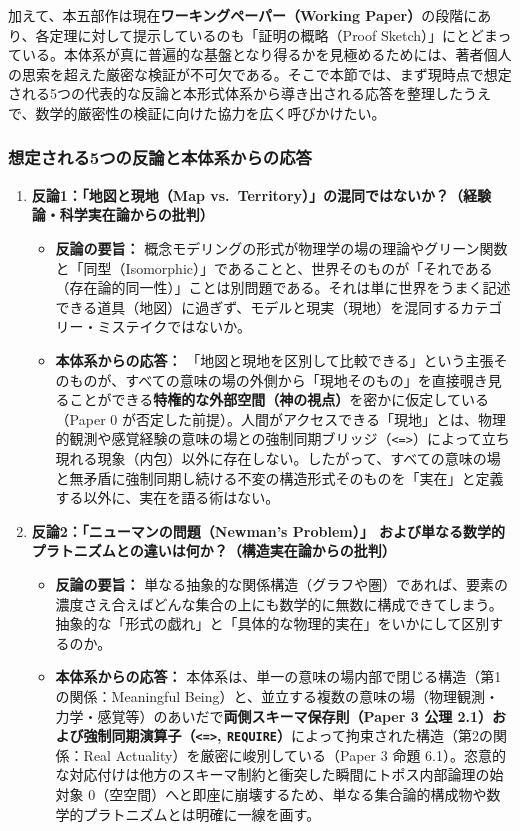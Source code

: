 \documentclass[11pt,a4paper]{ltjsarticle}
\theoremstyle{definition}
\theoremstyle{plain}
\begin{document}
加えて、本五部作は現在\textbf{ワーキングペーパー（Working Paper）}の段階にあり、各定理に対して提示しているのも「証明の概略（Proof Sketch）」にとどまっている。本体系が真に普遍的な基盤となり得るかを見極めるためには、著者個人の思索を超えた厳密な検証が不可欠である。そこで本節では、まず現時点で想定される5つの代表的な反論と本形式体系から導き出される応答を整理したうえで、数学的厳密性の検証に向けた協力を広く呼びかけたい。

\subsubsection*{想定される5つの反論と本体系からの応答}

\begin{enumerate}
    \item \textbf{反論1：「地図と現地（Map vs.\ Territory）」の混同ではないか？（経験論・科学実在論からの批判）}
    \begin{itemize}
        \item \textbf{反論の要旨：} 概念モデリングの形式が物理学の場の理論やグリーン関数と「同型（Isomorphic）」であることと、世界そのものが「それである（存在論的同一性）」ことは別問題である。それは単に世界をうまく記述できる道具（地図）に過ぎず、モデルと現実（現地）を混同するカテゴリー・ミステイクではないか。
        \item \textbf{本体系からの応答：} 「地図と現地を区別して比較できる」という主張そのものが、すべての意味の場の外側から「現地そのもの」を直接覗き見ることができる\textbf{特権的な外部空間（神の視点）}を密かに仮定している（Paper 0 \cite{Ota2026_0} が否定した前提）。人間がアクセスできる「現地」とは、物理的観測や感覚経験の意味の場との強制同期ブリッジ（\texttt{<=>}）によって立ち現れる現象（内包）以外に存在しない。したがって、すべての意味の場と無矛盾に強制同期し続ける不変の構造形式そのものを「実在」と定義する以外に、実在を語る術はない。
    \end{itemize}

    \item \textbf{反論2：「ニューマンの問題（Newman's Problem）」\cite{Newman1928} および単なる数学的プラトニズムとの違いは何か？（構造実在論からの批判）}
    \begin{itemize}
        \item \textbf{反論の要旨：} 単なる抽象的な関係構造（グラフや圏）であれば、要素の濃度さえ合えばどんな集合の上にも数学的に無数に構成できてしまう。抽象的な「形式の戯れ」と「具体的な物理的実在」をいかにして区別するのか。
        \item \textbf{本体系からの応答：} 本体系は、単一の意味の場内部で閉じる構造（第1の関係：Meaningful Being）と、並立する複数の意味の場（物理観測・力学・感覚等）のあいだで\textbf{両側スキーマ保存則（Paper 3 \cite{Ota2026_3} 公理 2.1）および強制同期演算子（\texttt{<=>}, \texttt{REQUIRE}）}によって拘束された構造（第2の関係：Real Actuality）を厳密に峻別している（Paper 3 \cite{Ota2026_3} 命題 6.1）。恣意的な対応付けは他方のスキーマ制約と衝突した瞬間にトポス内部論理の始対象 $0$（空空間）へと即座に崩壊するため、単なる集合論的構成物や数学的プラトニズムとは明確に一線を画す。
    \end{itemize}


\end{enumerate}
\end{document}
